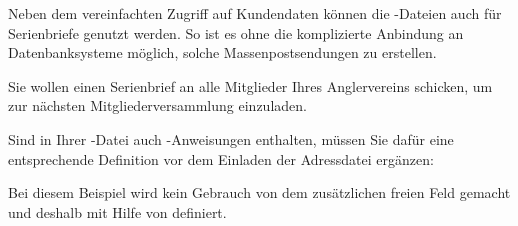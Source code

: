 Neben dem vereinfachten Zugriff auf Kundendaten können die
-Dateien auch für Serienbriefe
genutzt werden. So ist es ohne die komplizierte Anbindung an
Datenbanksysteme möglich, solche Massenpostsendungen zu erstellen.
%
\begin{Example}
  Sie wollen einen Serienbrief an alle Mitglieder Ihres
  Anglervereins schicken, um zur nächsten Mitgliederversammlung
  einzuladen.
  Sind in Ihrer -Datei auch
  -Anweisungen 
  enthalten, müssen Sie dafür eine entsprechende Definition vor dem
  Einladen der Adressdatei ergänzen:
\begin{lstcode}
  \renewcommand*{\addrentry}[9]{%
    \adrentry{#1}{#2}{#3}{#4}{#5}{#6}{#7}{#9}%
  }
\end{lstcode}
  Bei diesem Beispiel wird kein Gebrauch von dem zusätzlichen freien
  Feld gemacht und deshalb  mit Hilfe von
   definiert.
\end{Example}

